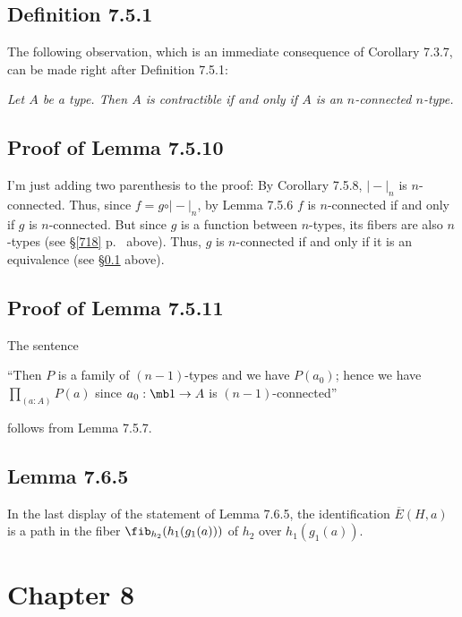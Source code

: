 \documentclass[12pt]{article}
\begin{document}

\subsection{Definition 7.5.1}\label{751}

The following observation, which is an immediate consequence of Corollary 7.3.7, can be made right after Definition 7.5.1:

\nn\emph{Let $A$ be a type. Then $A$ is contractible if and only if $A$ is an $n$-connected $n$-type.}


\subsection{Proof of Lemma 7.5.10}

I'm just adding two parenthesis to the proof: By Corollary 7.5.8, $\vert-\vert_n$ is $n$-connected. Thus, since $f=g\circ\vert-\vert_n$, by Lemma 7.5.6 $f$ is $n$-connected if and only if $g$ is $n$-connected. But since $g$ is a function between $n$-types, its fibers are also $n$-types (see \S\ref{718} p.~\pageref{718} above). Thus, $g$ is $n$-connected if and only if it is an equivalence (see \S\ref{751} above).


\subsection{Proof of Lemma 7.5.11}

The sentence 

\nn``Then $P$ is a family of $(n-1)$-types and we have $P(a_0)$; hence we have $\prod_{(a:A)}P(a)$ since $a_0:\mb1\to A$ is $(n-1)$-connected''

\nn follows from Lemma 7.5.7.


\subsection{Lemma 7.6.5}

In the last display of the statement of Lemma 7.6.5, the identification $\overline{E}(H,a)$ is a path in the fiber $\fib_{h_2}(h_1(g_1(a)))$ of $h_2$ over $h_1(g_1(a))$.


\section{Chapter 8}
\end{document}
